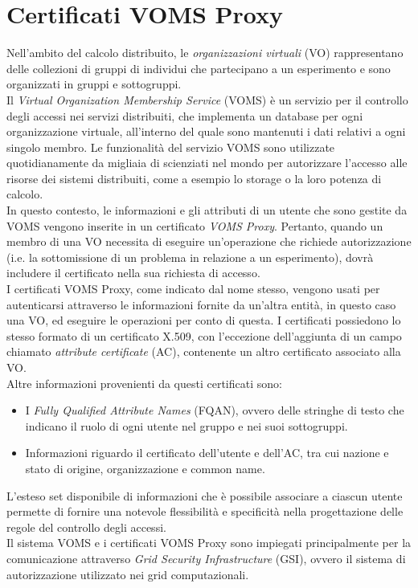 \section{Certificati VOMS Proxy}
Nell'ambito del calcolo distribuito, le \textit{organizzazioni virtuali} (VO) rappresentano delle collezioni di gruppi 
di individui che partecipano a un esperimento e sono organizzati in gruppi e sottogruppi. 
\\Il \textit{Virtual Organization Membership Service} (VOMS) \cite{voms_res_1} è un servizio per il controllo degli accessi 
nei servizi distribuiti, che implementa
un database per ogni organizzazione virtuale, all'interno del
quale sono mantenuti i dati relativi a ogni singolo membro. Le funzionalità del servizio VOMS sono utilizzate quotidianamente da 
migliaia di scienziati nel mondo per autorizzare l'accesso alle risorse dei sistemi distribuiti, come a esempio lo storage o la
loro potenza di calcolo. 
\\ In questo contesto, le informazioni e gli attributi di un utente che sono gestite da VOMS vengono inserite in un certificato \textit{VOMS Proxy}.
Pertanto, quando un membro di una VO necessita di eseguire un'operazione che richiede autorizzazione (i.e. la sottomissione di un problema in relazione a un esperimento), 
dovrà includere il certificato nella sua richiesta di accesso. 
\\ I certificati VOMS Proxy, come indicato dal nome stesso, vengono usati per autenticarsi attraverso le informazioni fornite da un'altra entità, in questo caso una VO, ed eseguire le operazioni
per conto di questa. I certificati possiedono lo stesso formato di un certificato X.509, con l'eccezione dell'aggiunta di un campo chiamato \textit{attribute certificate} (AC),
 contenente un altro certificato associato alla VO. 
\\ Altre informazioni provenienti da questi certificati sono:
\begin{itemize}
    \item I \textit{Fully Qualified Attribute Names} (FQAN), ovvero delle stringhe di testo che indicano il ruolo di ogni utente nel gruppo e nei suoi sottogruppi. 
    \item Informazioni riguardo il certificato dell'utente e dell'AC, tra cui nazione e stato di origine, organizzazione e common name.   
\end{itemize}
L'esteso set disponibile di informazioni che è possibile associare a ciascun utente permette di fornire
 una notevole flessibilità e specificità nella progettazione delle regole del controllo degli accessi. 
 \\ Il sistema VOMS e i certificati VOMS Proxy sono impiegati principalmente per la comunicazione attraverso \textit{Grid Security Infrastructure} (GSI), ovvero 
il sistema di autorizzazione utilizzato nei grid computazionali. 

